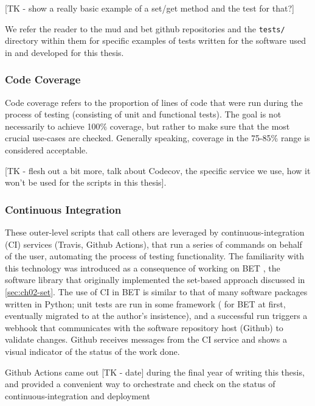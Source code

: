 [TK - show a really basic example of a set/get method and the test for that?]

We refer the reader to the mud and bet github repositories and the {\tt tests/} directory within them for specific examples of tests written for the software used in and developed for this thesis. 

\subsubsection{Code Coverage}\label{sec:code-coverage}

Code coverage refers to the proportion of lines of code that were run during the process of testing (consisting of unit and functional tests).
The goal is not necessarily to achieve 100\% coverage, but rather to make sure that the most crucial use-cases are checked.
Generally speaking, coverage in the 75-85\% range is considered acceptable.

[TK - flesh out a bit more, talk about Codecov, the specific service we use, how it won't be used for the scripts in this thesis].


\subsubsection{Continuous Integration}\label{sec:continuous-integration}

These outer-level scripts that call others are leveraged by continuous-integration (CI) services (Travis, Github Actions), that run a series of commands on behalf of the user, automating the process of testing functionality.
The familiarity with this technology was introduced as a consequence of working on BET \cite{pyBET}, the software library that originally implemented the set-based approach discussed in \ref{sec:ch02-set}.
The use of CI in BET is similar to that of many software packages written in Python; unit tests are run in some framework ( for BET at first, eventually migrated to  at the author's insistence), and a successful run triggers a webhook that communicates with the software repository host (Github) to validate changes. Github receives messages from the CI service and shows a visual indicator of the status of the work done.

Github Actions came out [TK - date] during the final year of writing this thesis, and provided a convenient way to orchestrate and check on the status of continuous-integration and deployment

